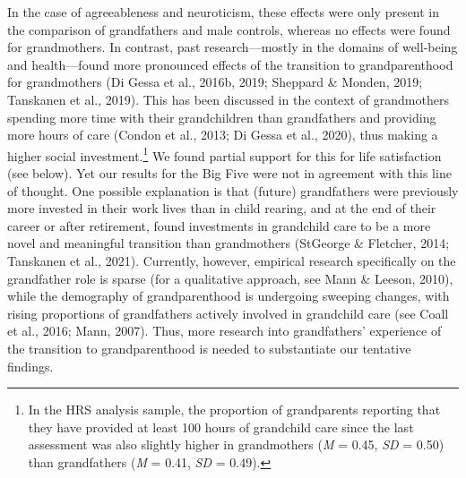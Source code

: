 \documentclass[
  english,
  man,floatsintext]{apa7}
\begin{document}
In the case of agreeableness and neuroticism, these effects were only present in the comparison of grandfathers and male controls, whereas no effects were found for grandmothers. In contrast, past research---mostly in the domains of well-being and health---found more pronounced effects of the transition to grandparenthood for grandmothers (Di Gessa et al., 2016b, 2019; Sheppard \& Monden, 2019; Tanskanen et al., 2019). This has been discussed in the context of grandmothers spending more time with their grandchildren than grandfathers and providing more hours of care (Condon et al., 2013; Di Gessa et al., 2020), thus making a higher social investment.\footnote{In the HRS analysis sample, the proportion of grandparents reporting that they have provided at least 100 hours of grandchild care since the last assessment was also slightly higher in grandmothers (\emph{M} = 0.45, \emph{SD} = 0.50) than grandfathers (\emph{M} = 0.41, \emph{SD} = 0.49).} We found partial support for this for life satisfaction (see below). Yet our results for the Big Five were not in agreement with this line of thought. One possible explanation is that (future) grandfathers were previously more invested in their work lives than in child rearing, and at the end of their career or after retirement, found investments in grandchild care to be a more novel and meaningful transition than grandmothers (StGeorge \& Fletcher, 2014; Tanskanen et al., 2021). Currently, however, empirical research specifically on the grandfather role is sparse (for a qualitative approach, see Mann \& Leeson, 2010), while the demography of grandparenthood is undergoing sweeping changes, with rising proportions of grandfathers actively involved in grandchild care (see Coall et al., 2016; Mann, 2007). Thus, more research into grandfathers' experience of the transition to grandparenthood is needed to substantiate our tentative findings.\\
\end{document}

